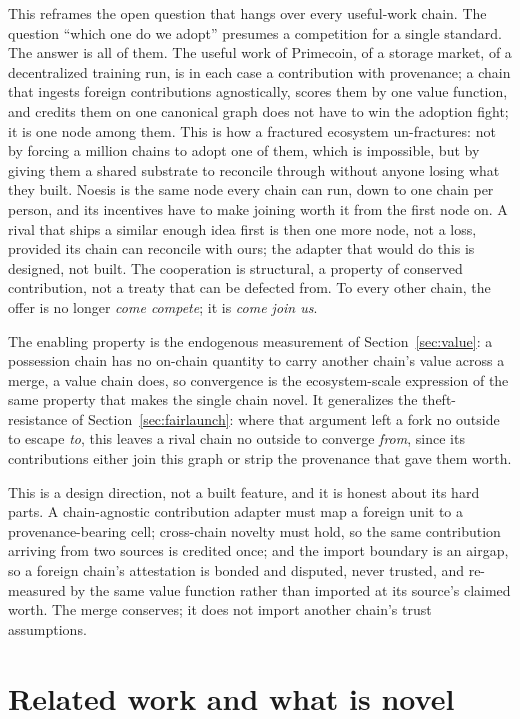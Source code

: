 \documentclass[10pt]{article}
\begin{document}
This reframes the open question that hangs over every useful-work chain. The question ``which one do we
adopt'' presumes a competition for a single standard. The answer is all of them. The useful work of
Primecoin, of a storage market, of a decentralized training run, is in each case a contribution with
provenance; a chain that ingests foreign contributions agnostically, scores them by one value function,
and credits them on one canonical graph does not have to win the adoption fight; it is one node among them. This is
how a fractured ecosystem un-fractures: not by forcing a million chains to adopt one of them, which is
impossible, but by giving them a shared substrate to reconcile through without anyone losing what they built. Noesis
is the same node every chain can run, down to one chain per person, and its incentives have to make
joining worth it from the first node on. A rival that ships a similar enough idea first is then one more
node, not a loss, provided its chain can reconcile with ours; the adapter that would do this is designed,
not built. The
cooperation is structural, a property of conserved contribution, not a treaty that can be defected from.
To every other chain, the offer is no longer \emph{come compete}; it is \emph{come join us}.

The enabling property is the endogenous measurement of Section~\ref{sec:value}: a possession chain has
no on-chain quantity to carry another chain's value across a merge, a value chain does, so convergence is
the ecosystem-scale expression of the same property that makes the single chain novel. It generalizes the
theft-resistance of Section~\ref{sec:fairlaunch}: where that argument left a fork no outside to escape
\emph{to}, this leaves a rival chain no outside to converge \emph{from}, since its contributions either
join this graph or strip the provenance that gave them worth.

This is a design direction, not a built feature, and it is honest about its hard parts. A chain-agnostic
contribution adapter must map a foreign unit to a provenance-bearing cell; cross-chain novelty must hold,
so the same contribution arriving from two sources is credited once; and the import boundary is an
airgap, so a foreign chain's attestation is bonded and disputed, never trusted, and re-measured by the
same value function rather than imported at its source's claimed worth. The merge conserves; it does not
import another chain's trust assumptions.

\section{Related work and what is novel}
\end{document}
